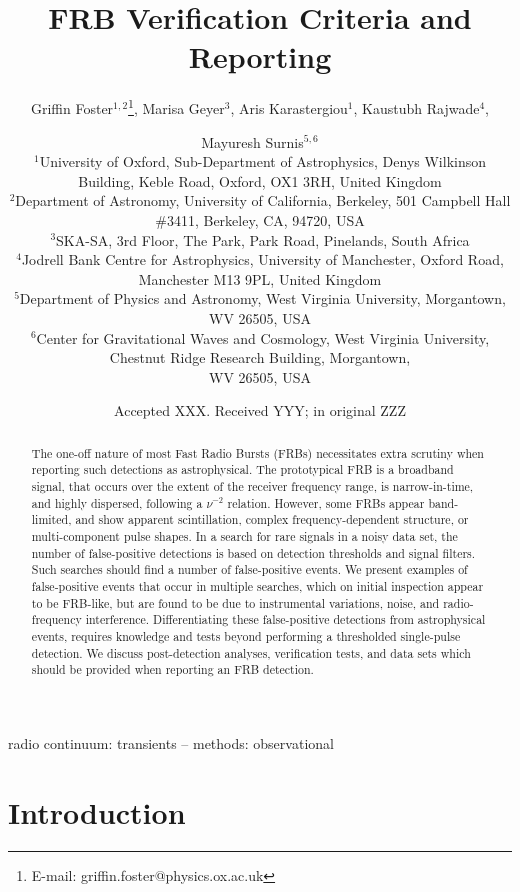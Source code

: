 \documentclass[a4paper,fleqn,usenatbib]{mnras}
\title[FRB Verification Criteria and Reporting]{FRB Verification Criteria and Reporting}
\author[G. Foster et al.]{
Griffin Foster$^{1,2}$\thanks{E-mail: griffin.foster@physics.ox.ac.uk},
Marisa Geyer$^{3}$,
Aris Karastergiou$^{1}$,
Kaustubh Rajwade$^{4}$, 
\and Mayuresh Surnis$^{5,6}$
\\
$^{1}$University of Oxford, Sub-Department of Astrophysics, Denys Wilkinson Building, Keble Road, Oxford, OX1 3RH, United Kingdom\\
$^{2}$Department of Astronomy, University of California, Berkeley, 501 Campbell
Hall \#3411, Berkeley, CA, 94720, USA\\
$^{3}$SKA-SA, 3rd Floor, The Park, Park Road, Pinelands, South Africa\\
$^{4}$Jodrell Bank Centre for Astrophysics, University of Manchester, Oxford Road, Manchester M13 9PL, United Kingdom\\
$^{5}$Department of Physics and Astronomy, West Virginia University, Morgantown, WV 26505, USA\\
$^{6}$Center for Gravitational Waves and Cosmology, West Virginia University, Chestnut Ridge Research Building, Morgantown,\\ WV 26505, USA\\
}
\date{Accepted XXX. Received YYY; in original ZZZ}
\begin{document}
\label{firstpage}
\pagerange{\pageref{firstpage}--\pageref{lastpage}}
\maketitle

\begin{abstract}
The one-off nature of most Fast Radio Bursts (FRBs) necessitates extra scrutiny when
reporting such detections as astrophysical.  The prototypical FRB is a broadband
signal, that occurs over the extent of the receiver frequency range, is
narrow-in-time, and highly dispersed, following a $\nu^{-2}$ relation.  However,
some FRBs appear band-limited, and show apparent scintillation, complex
frequency-dependent structure, or multi-component pulse shapes.  In a search for
rare signals in a noisy data set, the number of false-positive detections is
based on detection thresholds and signal filters.  Such searches should find a
number of false-positive events.  We present examples of false-positive events
that occur in multiple searches, which on initial inspection appear to be
FRB-like, but are found to be due to instrumental variations, noise, and
radio-frequency interference.  Differentiating these false-positive detections
from astrophysical events, requires knowledge and tests beyond performing a
thresholded single-pulse detection.  We discuss post-detection analyses,
verification tests, and data sets which should be provided when reporting an FRB
detection.
\end{abstract}

\begin{keywords}
radio continuum: transients -- methods: observational
\end{keywords}


\section{Introduction}
\label{sec:intro}
\end{document}
